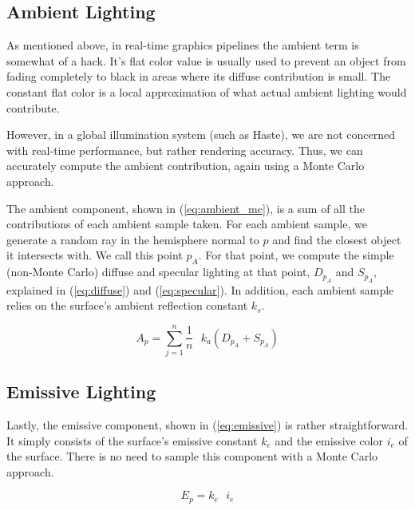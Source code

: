 \documentclass{acmsiggraph}                     %
\begin{document}
    \subsection{Ambient Lighting}
    \label{sec:ambient}

    As mentioned above, in real-time graphics pipelines the ambient term is somewhat of
    a hack. It's flat color value is usually used to prevent an object from fading completely
    to black in areas where its diffuse contribution is small. The constant flat
    color is a local approximation of what actual ambient lighting would contribute.

    However, in a global illumination system (such as Haste), we are not concerned with
    real-time performance, but rather rendering accuracy. Thus, we can accurately compute
    the ambient contribution, again using a Monte Carlo approach.

    The ambient component, shown in (\ref{eq:ambient_mc}), is a sum of all the contributions
    of each ambient sample taken. For each ambient sample, we generate a random ray in the
    hemisphere normal to $p$ and find the closest object it intersects with. We call this point
    $p_{A}$. For that point, we compute the simple (non-Monte Carlo) diffuse and specular
    lighting at that point, $D_{p_{A}}$ and $S_{p_{A}}$, explained in (\ref{eq:diffuse}) and
    (\ref{eq:specular}). In addition, each ambient sample relies on the surface's ambient
    reflection constant $k_{s}$.

    \begin{equation}
        \label{eq:ambient_mc}
        A_{p} = \sum_{j = 1}^{n} \frac{1}{n} \textrm{ }
            k_{a} \left( D_{p_{A}} + S_{p_{A}} \right)
    \end{equation}
    
    \subsection{Emissive Lighting}
    \label{sec:emissive}

    Lastly, the emissive component, shown in (\ref{eq:emissive}) is rather straightforward.
    It simply consists of the surface's emissive constant $k_{e}$ and the emissive color
    $i_{e}$ of the surface. There is no need to sample this component with a Monte Carlo
    approach.

    \begin{equation}
        \label{eq:emissive}
        E_{p} = k_{e} \textrm{ } i_{e}
    \end{equation}
\end{document}

